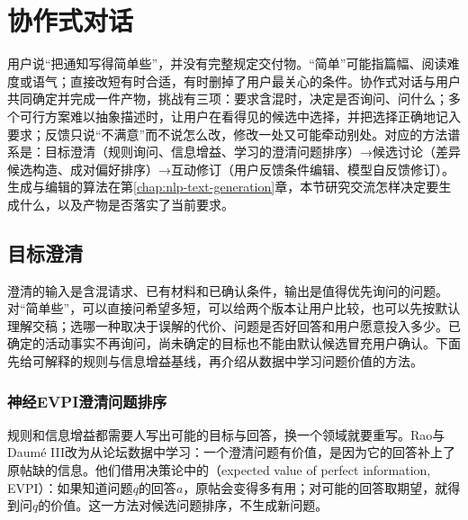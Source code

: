 \section{协作式对话}
\label{sec:nlp-dialogue-collaboration}

用户说“把通知写得简单些”，并没有完整规定交付物。“简单”可能指篇幅、阅读难度或语气；直接改短有时合适，有时删掉了用户最关心的条件。协作式对话与用户共同确定并完成一件产物，挑战有三项：要求含混时，决定是否询问、问什么；多个可行方案难以抽象描述时，让用户在看得见的候选中选择，并把选择正确地记入要求；反馈只说“不满意”而不说怎么改，修改一处又可能牵动别处。对应的方法谱系是：目标澄清（规则询问、信息增益、学习的澄清问题排序）→候选讨论（差异候选构造、成对偏好排序）→互动修订（用户反馈条件编辑、模型自反馈修订）。生成与编辑的算法在第\ref{chap:nlp-text-generation}章，本节研究交流怎样决定要生成什么，以及产物是否落实了当前要求。

\subsection{目标澄清}
\label{sec:nlp-dialogue-clarification}

澄清的输入是含混请求、已有材料和已确认条件，输出是值得优先询问的问题。对“简单些”，可以直接问希望多短，可以给两个版本让用户比较，也可以先按默认理解交稿；选哪一种取决于误解的代价、问题是否好回答和用户愿意投入多少。已确定的活动事实不再询问，尚未确定的目标也不能由默认候选冒充用户确认。下面先给可解释的规则与信息增益基线，再介绍从数据中学习问题价值的方法。

\subsubsection{神经EVPI澄清问题排序}
\label{sec:nlp-dialogue-evpi}

规则和信息增益都需要人写出可能的目标与回答，换一个领域就要重写。Rao与Daumé III改为从论坛数据中学习：一个澄清问题有价值，是因为它的回答补上了原帖缺的信息。他们借用决策论中的（expected value of perfect information, EVPI）：如果知道问题$q$的回答$a$，原帖会变得多有用；对可能的回答取期望，就得到问$q$的价值。这一方法对候选问题排序，不生成新问题。


